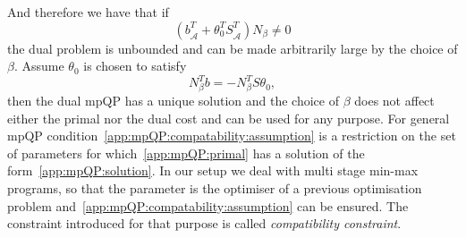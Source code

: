 %
And therefore we have that if
%
\begin{equation}
	(b^T_{\hat{\mathcal A}}+\theta^T_0 S^T_{\hat{\mathcal A}})N_\beta \neq 0
\end{equation}
%
the dual problem is unbounded and can be made arbitrarily large by the choice of $\beta$. Assume
$\theta_0$ is chosen to satisfy 
%
\begin{equation}\label{app:mpQP:compatability:assumption}
	N_\beta^Tb = -N_\beta^TS\theta_0,
\end{equation} 
%
then the dual mpQP has a unique solution
and the choice of $\beta$ does not affect either the primal nor the dual cost and can be used for
any purpose. For general mpQP condition~\eqref{app:mpQP:compatability:assumption} is a restriction on the set
of parameters for which~\eqref{app:mpQP:primal} has a solution of the form~\eqref{app:mpQP:solution}.
%
In our setup we deal with multi stage min-max programs, so that the parameter is the optimiser 
of a previous optimisation problem and~\eqref{app:mpQP:compatability:assumption} can be ensured. 
%
The constraint introduced for that purpose is called \emph{compatibility constraint}. 


